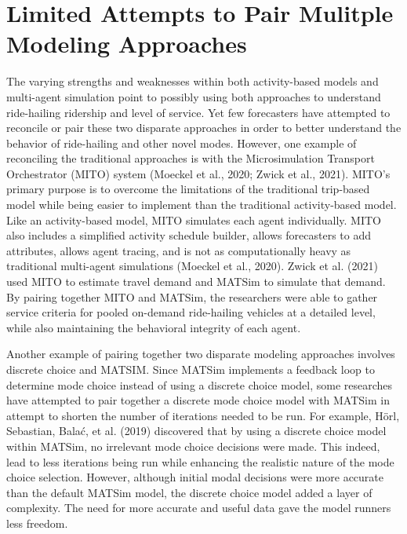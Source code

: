 \documentclass[fancy, masters]{byuthesis}
\begin{document}
\hypertarget{limited-attempts-to-pair-mulitple-modeling-approaches}{%
\section{Limited Attempts to Pair Mulitple Modeling Approaches}\label{limited-attempts-to-pair-mulitple-modeling-approaches}}

The varying strengths and weaknesses within both activity-based models and multi-agent simulation point to possibly using both approaches to understand ride-hailing ridership and level of service. Yet few forecasters have attempted to reconcile or pair these two disparate approaches in order to better understand the behavior of ride-hailing and other novel modes. However, one example of reconciling the traditional approaches is with the Microsimulation Transport Orchestrator (MITO) system (Moeckel et al., 2020; Zwick et al., 2021). MITO's primary purpose is to overcome the limitations of the traditional trip-based model while being easier to implement than the traditional activity-based model. Like an activity-based model, MITO simulates each agent individually. MITO also includes a simplified activity schedule builder, allows forecasters to add attributes, allows agent tracing, and is not as computationally heavy as traditional multi-agent simulations (Moeckel et al., 2020). Zwick et al. (2021) used MITO to estimate travel demand and MATSim to simulate that demand. By pairing together MITO and MATSim, the researchers were able to gather service criteria for pooled on-demand ride-hailing vehicles at a detailed level, while also maintaining the behavioral integrity of each agent.

Another example of pairing together two disparate modeling approaches involves discrete choice and MATSIM. Since MATSim implements a feedback loop to determine mode choice instead of using a discrete choice model, some researches have attempted to pair together a discrete mode choice model with MATSim in attempt to shorten the number of iterations needed to be run. For example, Hörl, Sebastian, Balać, et al. (2019) discovered that by using a discrete choice model within MATSim, no irrelevant mode choice decisions were made. This indeed, lead to less iterations being run while enhancing the realistic nature of the mode choice selection. However, although initial modal decisions were more accurate than the default MATSim model, the discrete choice model added a layer of complexity. The need for more accurate and useful data gave the model runners less freedom.
\end{document}

